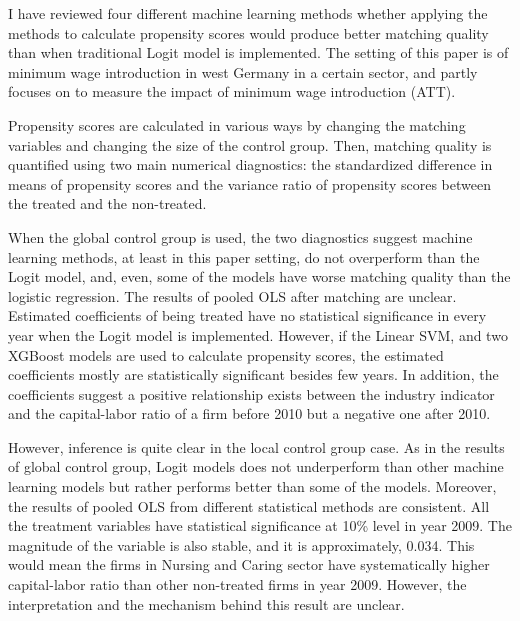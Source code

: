 \documentclass[11pt,a4paper,oneside]{article}
\begin{document}
I have reviewed four different machine learning methods whether applying the methods to calculate propensity scores would produce better matching quality than when traditional Logit model is implemented. The setting of this paper is of minimum wage introduction in west Germany in a certain sector, and partly focuses on to measure the impact of minimum wage introduction (ATT). 
\par
Propensity scores are calculated in various ways by changing the matching variables and changing the size of the control group. Then, matching quality is quantified using two main numerical diagnostics: the standardized difference in means of propensity scores and the variance ratio of propensity scores between the treated and the non-treated.
\par
When the global control group is used, the two diagnostics suggest machine learning methods, at least in this paper setting, do not overperform than the Logit model, and, even, some of the models have worse matching quality than the logistic regression. The results of pooled OLS after matching are unclear. Estimated coefficients of being treated have no statistical significance in every year when the Logit model is implemented. However, if the Linear SVM, and two XGBoost models are used to calculate propensity scores, the estimated coefficients mostly are statistically significant besides few years. In addition, the coefficients suggest a positive relationship exists between the industry indicator and the capital-labor ratio of a firm before 2010 but a negative one after 2010.
\par
However, inference is quite clear in the local control group case. As in the results of global control group, Logit models does not underperform than other machine learning models but rather performs better than some of the models. Moreover, the results of pooled OLS from different statistical methods are consistent. All the treatment variables have statistical significance at 10\% level in year 2009. The magnitude of the variable is also stable, and it is approximately, 0.034. This would mean the firms in Nursing and Caring sector have systematically higher capital-labor ratio than other non-treated firms in year 2009. However, the interpretation and the mechanism behind this result are unclear.
\end{document}
